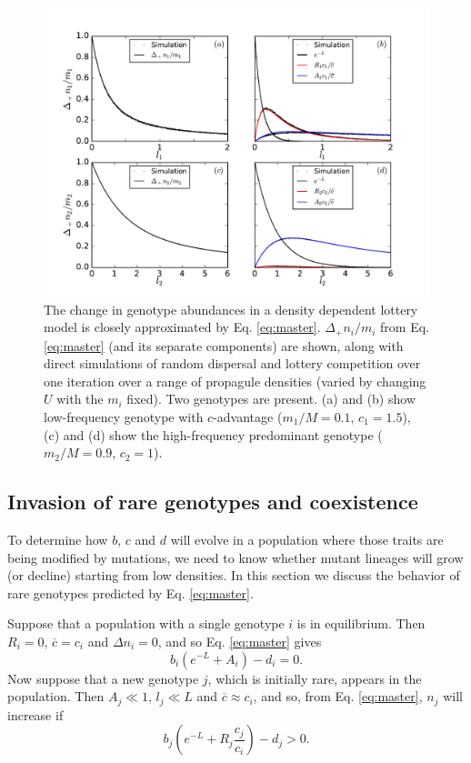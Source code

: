 \documentclass[11pt]{article}
\begin{document}
\begin{figure}
\centering
\includegraphics[scale=0.7]{simulationcomparison.pdf}
\caption{\label{fig:simcomp} The change in genotype abundances in a density dependent lottery model is closely approximated by Eq. \eqref{eq:master}. $\Delta_+ n_i/m_i$ from Eq. \eqref{eq:master} (and its separate components) are shown, along with direct simulations of random dispersal and lottery competition over one iteration over a range of propagule densities (varied by changing $U$ with the $m_i$ fixed). Two genotypes are present. (a) and (b) show low-frequency genotype with $c$-advantage ($m_1/M=0.1$, $c_1=1.5$), (c) and (d) show the high-frequency predominant genotype ($m_2/M=0.9$, $c_2=1$).} 
\end{figure}


\subsection*{Invasion of rare genotypes and coexistence}\label{sec:invas}

To determine how $b$, $c$ and $d$ will evolve in a population where those traits are being modified by mutations, we need to know whether mutant lineages will grow (or decline) starting from low densities. In this section we discuss the behavior of rare genotypes predicted by Eq. \eqref{eq:master}. 

Suppose that a population with a single genotype $i$ is in equilibrium. Then $R_i=0$, $\overline{c}=c_i$ and $\Delta n_i = 0$, and so Eq. \eqref{eq:master} gives
\begin{equation}
b_i\left(e^{-L}+A_i\right)-d_i=0.\label{eq:equil}
\end{equation}
Now suppose that a new genotype $j$, which is initially rare, appears in the population. Then $A_j\ll 1$, $l_j\ll L$ and $\overline{c}\approx c_i$, and so, from Eq. \eqref{eq:master}, $n_j$ will increase if 
\begin{equation}
b_j \left(e^{-L}+R_j\frac{c_j}{c_i}\right)-d_j>0.\label{eq:invad}
\end{equation}
\end{document}
